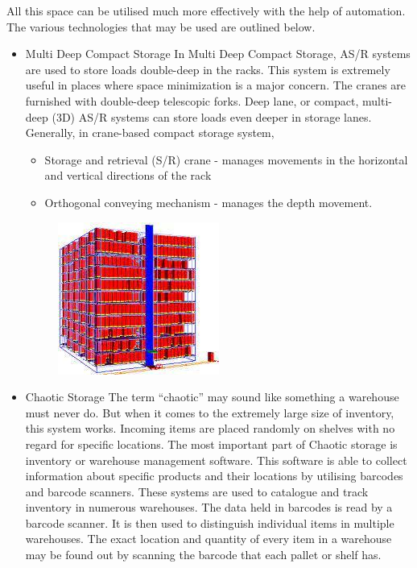\documentclass{report}
\begin{document}
All this space can be utilised much more effectively with the help of automation. The various technologies that may be used are outlined below.
\begin{itemize}
    \item{Multi Deep Compact Storage
\newline\newline
In Multi Deep Compact Storage, AS/R systems are used to store loads double-deep in the racks. This system is extremely useful in places where space minimization is a major concern. The cranes are furnished with double-deep telescopic forks. Deep lane, or compact, multi-deep (3D) AS/R systems can store loads even deeper in storage lanes. 
Generally, in crane-based compact storage system,
\begin{itemize}
    \item {Storage and retrieval (S/R) crane - manages movements in the horizontal and vertical directions of the rack}
\item{Orthogonal conveying mechanism - manages the depth movement\cite{5451644}.}
\end{itemize}}

\begin{figure}[H]
    
    \centering
    \includegraphics[scale=0.4]{storage.jpg}
    \caption{}
    
\end{figure}

\item{Chaotic Storage
\newline\newline
The term “chaotic” may sound like something a warehouse must never do. But when it comes to the extremely large size of inventory, this system works. Incoming items are placed randomly on shelves with no regard for specific locations. The most important part of Chaotic storage is inventory or warehouse management software. This software is able to collect information about specific products and their locations by utilising barcodes and barcode scanners. These systems are used to catalogue and track inventory in numerous warehouses. The data held in barcodes is read by a barcode scanner. It is then used to distinguish individual items in multiple warehouses. The exact location and quantity of every item in a warehouse may be found out by scanning the barcode that each pallet or shelf has.}
\end{itemize}
\end{document}
